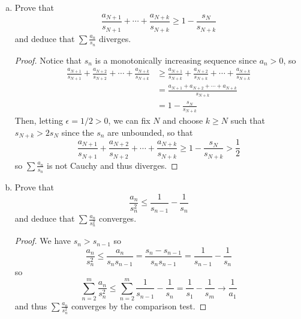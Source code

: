 \begin{enumerate}
\begin{enumerate}[(a)]
\begin{proof}
We prove the contrapositive. Let $b_n = \frac{a_n}{1 + a_n}$ and suppose $\sum b_n$ converges. Then we know $b_n \to 0$ so $1 - b_n = \frac{1}{1 + a_n} \to 1$. Thus for $0 < \epsilon < \frac{1}{2}$, there exists $N \in \N$ such that if $n \ge N$, 
\[
	\left|\frac{1}{1 + a_n} - 1\right| = \left| \frac{b_n}{a_n} - 1 \right| < \frac{1}{2}
\]
so $a_n < 2b_n$ if $n \ge N$. This implies that
\[
	\sum_{n = N}^{m} a_n < 2\sum_{n = N}^{m} b_n < M
\]
where $m \ge N$ and $M$ is a bound on the partial sums of $\sum b_n$ which exists since $\sum b_n$ converges. So the partial sums of $\sum a_n$ monotonically increasing and bounded above, so $\sum a_n$ converges.
\end{proof}
\item Prove that
\[
	\frac{a_{N+1}}{s_{N+1}} + \dotsb + \frac{a_{N+k}}{s_{N+k}} \ge 1 - \frac{s_N}{s_{N+k}}
\]
and deduce that $\sum \frac{a_n}{s_n}$ diverges.

\begin{proof}
Notice that $s_n$ is a monotonically increasing sequence since $a_n > 0$, so
\begin{align*}
\frac{a_{N+1}}{s_{N+1}} + \frac{a_{N+2}}{s_{N+2}} + \dotsb + \frac{a_{N+k}}{s_{N+k}} &\ge \frac{a_{N+1}}{s_{N+k}} + \frac{a_{N+2}}{s_{N+k}} + \dotsb + \frac{a_{N+k}}{s_{N+k}} \\
	&= \frac{a_{N+1} + a_{N+2} + \dotsb + a_{N+k}}{s_{N+k}} \\
	&= 1 - \frac{s_N}{s_{N+k}}
\end{align*}
Then, letting $\epsilon = 1/2 > 0$, we can fix $N$ and choose $k \ge N$ such that $s_{N+k} > 2s_N$ since the $s_n$ are unbounded, so that
\[
	\frac{a_{N+1}}{s_{N+1}} + \frac{a_{N+2}}{s_{N+2}} + \dotsb + \frac{a_{N+k}}{s_{N+k}} \ge 1 - \frac{s_N}{s_{N+k}} > \frac12
\]
so $\sum \frac{a_n}{s_n}$ is not Cauchy and thus diverges.
\end{proof}
\item Prove that
\[
	\frac{a_n}{s_n^2} \le \frac{1}{s_{n-1}} - \frac{1}{s_n}
\]
and deduce that $\sum \frac{a_n}{s_n^2}$ converges.

\begin{proof}
We have $s_n > s_{n-1}$ so
\[
	\frac{a_n}{s_n^2} \le \frac{a_n}{s_n s_{n-1}} = \frac{s_n - s_{n-1}}{s_n s_{n-1}} = \frac{1}{s_{n-1}} - \frac{1}{s_n}
\]
so
\[
	\sum_{n=2}^{m} \frac{a_n}{s_n^2} \le \sum_{n=2}^{m} \frac{1}{s_{n-1}} - \frac{1}{s_n} = \frac{1}{s_1} - \frac{1}{s_m} \to \frac{1}{a_1}
\]
and thus $\sum \frac{a_n}{s_n^2}$ converges by the comparison test.
\end{proof}


\end{enumerate}
\end{enumerate}
